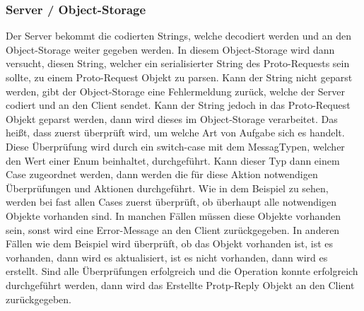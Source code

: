 \subsubsection{Server / Object-Storage}
Der Server bekommt die codierten Strings, welche decodiert werden und an den Object-Storage weiter gegeben werden. In diesem Object-Storage wird dann versucht, diesen String, welcher ein serialisierter String des Proto-Requests sein sollte, zu einem Proto-Request Objekt zu parsen. Kann der String nicht geparst werden, gibt der Object-Storage eine Fehlermeldung zurück, welche der Server codiert und an den Client sendet. Kann der String jedoch in das Proto-Request Objekt geparst werden, dann wird dieses im Object-Storage verarbeitet. Das heißt, dass zuerst überprüft wird, um welche Art von Aufgabe sich es handelt. Diese Überprüfung wird durch ein switch-case mit dem MessagTypen, welcher den Wert einer Enum beinhaltet, durchgeführt. Kann dieser Typ dann einem Case zugeordnet werden, dann werden die für diese Aktion notwendigen Überprüfungen und Aktionen durchgeführt. Wie in dem Beispiel zu sehen, werden bei fast allen Cases zuerst überprüft, ob überhaupt alle notwendigen Objekte vorhanden sind. In manchen Fällen müssen diese Objekte vorhanden sein, sonst wird eine Error-Message an den Client zurückgegeben. In anderen Fällen wie dem Beispiel wird überprüft, ob das Objekt vorhanden ist, ist es vorhanden, dann wird es aktualisiert, ist es nicht vorhanden, dann wird es erstellt. Sind alle Überprüfungen erfolgreich und die Operation konnte erfolgreich durchgeführt werden, dann wird das Erstellte Protp-Reply Objekt an den Client zurückgegeben.

